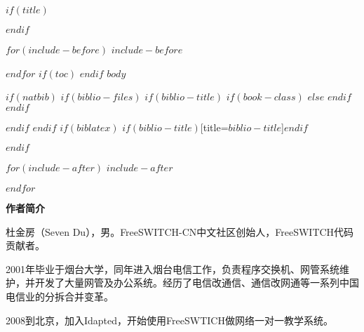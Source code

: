 \documentclass[$if(fontsize)$$fontsize$,$endif$$if(lang)$$lang$,$endif$CJKutf8,twoside,openright]{$documentclass$}
\makeatletter
\def\maxwidth{\ifdim\Gin@nat@width>\linewidth\linewidth
\else\Gin@nat@width\fi}
\let\Oldincludegraphics\includegraphics
\renewcommand{\includegraphics}[1]{\Oldincludegraphics[width=\maxwidth]{#1}}
\makeatother
\begin{document}

\newpage





$if(title)$
\maketitle
$endif$

$for(include-before)$
$include-before$

$endfor$
$if(toc)$
{
\hypersetup{linkcolor=blue}
\tableofcontents
}
$endif$
$body$

$if(natbib)$
$if(biblio-files)$
$if(biblio-title)$
$if(book-class)$
\renewcommand\bibname{$biblio-title$}
$else$
\renewcommand\refname{$biblio-title$}
$endif$
$endif$


$endif$
$endif$
$if(biblatex)$
\printbibliography$if(biblio-title)$[title=$biblio-title$]$endif$

$endif$

$for(include-after)$
$include-after$

$endfor$

\newpage

{\large \bf 作者简介}

杜金房（Seven Du），男。FreeSWITCH-CN中文社区创始人，FreeSWITCH代码贡献者。

2001年毕业于烟台大学，同年进入烟台电信工作，负责程序交换机、网管系统维护，并开发了大量网管及办公系统。经历了电信改通信、通信改网通等一系列中国电信业的分拆合并变革。

2008到北京，加入Idapted，开始使用FreeSWTICH做网络一对一教学系统。
\end{document}

